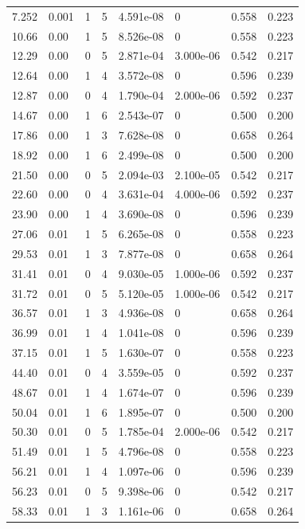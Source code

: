 \documentclass[preview]{standalone}
\begin{document}
{{\begin{tabular}{L{1.2cm}C{1.2cm} C{0.3cm}C{0.5cm} C{1.4cm}C{1.4cm} C{1.4cm}C{1.4cm}}
  7.252  &  0.001  & 1     &  5 &  4.591e-08  & 0  & 0.558 &  0.223   \\ 
  10.66  &  0.00  & 1     &  5 &  8.526e-08  & 0  & 0.558 &  0.223   \\ 
  12.29  &  0.00  & 0     &  5 &  2.871e-04  & 3.000e-06  & 0.542 &  0.217   \\ 
  12.64  &  0.00  & 1     &  4 &  3.572e-08  & 0  & 0.596 &  0.239   \\ 
  12.87  &  0.00  & 0     &  4 &  1.790e-04  & 2.000e-06  & 0.592 &  0.237   \\ 
  14.67  &  0.00  & 1     &  6 &  2.543e-07  & 0  & 0.500 &  0.200   \\ 
  17.86  &  0.00  & 1     &  3 &  7.628e-08  & 0  & 0.658 &  0.264   \\ 
  18.92  &  0.00  & 1     &  6 &  2.499e-08  & 0  & 0.500 &  0.200   \\ 
  21.50  &  0.00  & 0     &  5 &  2.094e-03  & 2.100e-05  & 0.542 &  0.217   \\ 
  22.60  &  0.00  & 0     &  4 &  3.631e-04  & 4.000e-06  & 0.592 &  0.237   \\ 
  23.90  &  0.00  & 1     &  4 &  3.690e-08  & 0  & 0.596 &  0.239   \\ 
  27.06  &  0.01  & 1     &  5 &  6.265e-08  & 0  & 0.558 &  0.223   \\ 
  29.53  &  0.01  & 1     &  3 &  7.877e-08  & 0  & 0.658 &  0.264   \\ 
  31.41  &  0.01  & 0     &  4 &  9.030e-05  & 1.000e-06  & 0.592 &  0.237   \\ 
  31.72  &  0.01  & 0     &  5 &  5.120e-05  & 1.000e-06  & 0.542 &  0.217   \\ 
  36.57  &  0.01  & 1     &  3 &  4.936e-08  & 0  & 0.658 &  0.264   \\ 
  36.99  &  0.01  & 1     &  4 &  1.041e-08  & 0  & 0.596 &  0.239   \\ 
  37.15  &  0.01  & 1     &  5 &  1.630e-07  & 0  & 0.558 &  0.223   \\ 
  44.40  &  0.01  & 0     &  4 &  3.559e-05  & 0  & 0.592 &  0.237   \\ 
  48.67  &  0.01  & 1     &  4 &  1.674e-07  & 0  & 0.596 &  0.239   \\ 
  50.04  &  0.01  & 1     &  6 &  1.895e-07  & 0  & 0.500 &  0.200   \\ 
  50.30  &  0.01  & 0     &  5 &  1.785e-04  & 2.000e-06  & 0.542 &  0.217   \\ 
  51.49  &  0.01  & 1     &  5 &  4.796e-08  & 0  & 0.558 &  0.223   \\ 
  56.21  &  0.01  & 1     &  4 &  1.097e-06  & 0  & 0.596 &  0.239   \\ 
  56.23  &  0.01  & 0     &  5 &  9.398e-06  & 0  & 0.542 &  0.217   \\ 
  58.33  &  0.01  & 1     &  3 &  1.161e-06  & 0  & 0.658 &  0.264   \\ 
\hline 
\end{tabular} 

}}
\end{document}
